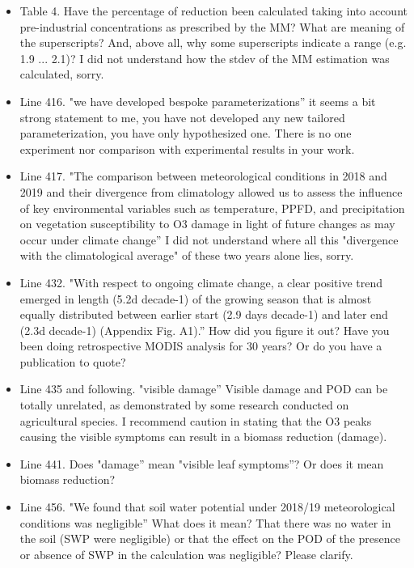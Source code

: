 \documentclass{scrartcl}
\begin{document}
\begin{itemize}
\item {\color{blue}Table 4.  Have the percentage of reduction been calculated taking into account pre-industrial concentrations as prescribed by the MM?
What are meaning of the superscripts? And, above all, why some superscripts indicate a range (e.g. 1.9 ... 2.1)? I did not understand how the stdev of the MM estimation was calculated, sorry.}

\item {\color{blue}Line 416. "we have developed bespoke parameterizations”
it seems a bit strong statement to me, you have not developed any new tailored
parameterization, you have only hypothesized one. There is no one experiment nor
comparison with experimental results in your work.}

\item {\color{blue}Line 417. "The comparison between meteorological conditions in 2018 and 2019 and their divergence from climatology allowed us to assess the influence of key environmental variables such as temperature, PPFD, and precipitation on vegetation susceptibility to O3 damage in light of future changes as may occur under climate change” I did not understand where all this "divergence with the climatological average" of these two years alone lies, sorry.}

\item {\color{blue}Line 432. "With respect to ongoing climate change, a clear positive trend emerged in length (5.2d decade-1) of the growing season that is almost equally distributed between earlier start (2.9 days decade-1) and later end (2.3d decade-1) (Appendix Fig. A1).” How did you figure it out? Have you been doing retrospective MODIS analysis for 30 years? Or do you have a publication to quote?}

\item {\color{blue}Line 435 and following. "visible damage”
Visible damage and POD can be totally unrelated, as demonstrated by some research
conducted on agricultural species. I recommend caution in stating that the O3 peaks
causing the visible symptoms can result in a biomass reduction (damage).}

\item {\color{blue}Line 441. Does "damage” mean "visible leaf symptoms”? Or does it mean biomass reduction?}

\item {\color{blue}Line 456. "We found that soil water potential under 2018/19 meteorological conditions was negligible” What does it mean? That there was no water in the soil (SWP were negligible) or that the effect on the POD of the presence or absence of SWP in the calculation was negligible? Please clarify.}


\end{itemize}
\end{document}
